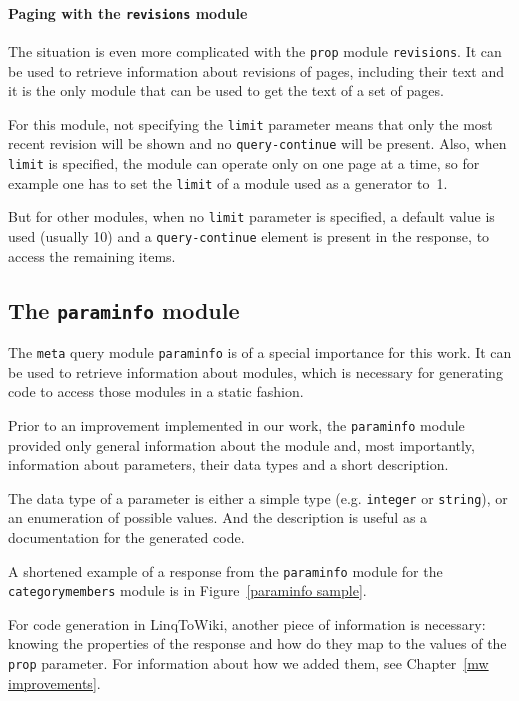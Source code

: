 \paragraph{Paging with the \texttt{revisions} module}

The situation is even more complicated with the \texttt{prop} module \texttt{revisions}.
It can be used to retrieve information about revisions of pages, including their text
and it is the only module that can be used to get the text of a set of pages.

For this module, not specifying the \texttt{limit} parameter means that only the most
recent revision will be shown and no \texttt{query-continue} will be present.
Also, when \texttt{limit} is specified, the module can operate only on one page at a time,
so for example one has to set the \texttt{limit} of a module used as a generator to~1.

But for other modules, when no \texttt{limit} parameter is specified, a default value is used (usually 10)
and a \texttt{query-continue} element is present in the response, to access the remaining items.

\subsection{The \texttt{paraminfo} module}
\label{paraminfo}

The \texttt{meta} query module \texttt{paraminfo} is of a special importance for this work.
It can be used to retrieve information about modules,
which is necessary for generating code to access those modules in a static fashion.

Prior to an improvement implemented in our work,
the \texttt{paraminfo} module provided only general information about the module
and, most importantly, information about parameters, their data types and a short description.

The data type of a parameter is either a simple type (e.g. \texttt{integer} or \texttt{string}),
or an enumeration of possible values.
And the description is useful as a documentation for the generated code.

A shortened example of a response from the \texttt{paraminfo} module
for the \texttt{categorymembers} module is in Figure~\ref{paraminfo sample}.

For code generation in LinqToWiki, another piece of information is necessary:
knowing the properties of the response and how do they map to the values of the \texttt{prop} parameter.
For information about how we added them, see Chapter~\ref{mw improvements}.

